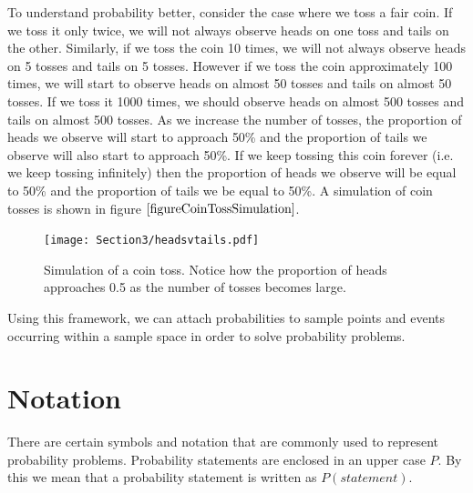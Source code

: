 To understand probability better, consider the case where we toss a fair coin. If we toss it only twice, we will not always observe heads on one toss and tails on the other. Similarly, if we toss the coin 10 times, we will not always observe heads on 5 tosses
and tails on 5 tosses. However if we toss the coin approximately 100 times, we will start to observe heads on almost 50 tosses and tails on almost 50 tosses. If we toss it 1000 times, we should 
observe heads on almost 500 tosses and tails on almost 500 tosses. As we increase the number of tosses, the proportion of heads we observe will start to approach 50\% and the proportion of tails we observe will also start to approach 50\%. If we keep tossing this coin forever (i.e. we keep tossing infinitely) then the proportion of heads we observe will be equal to 50\% and the proportion of tails we be equal to 50\%. A simulation of coin tosses is shown in figure $\ref{figureCoinTossSimulation}$.\\

\begin{figure}[H]
\label{figureCoinTossSimulation}
\begin{center}
	\texttt{[image: Section3/headsvtails.pdf]}
\end{center}
\caption{Simulation of a coin toss. 
	Notice how the proportion of heads approaches 0.5 as the number of tosses becomes large.}
\end{figure}

Using this framework, we can attach probabilities to sample points and events occurring within a sample space in order to solve probability problems.

\section{Notation}\label{sectionNotation}

There are certain symbols and notation that are commonly used
to represent probability problems.
Probability statements are enclosed in an upper case $P$.
By this we mean that a probability statement 
is written as $P(statement)$.\\



